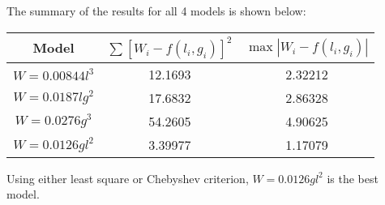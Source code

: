 \documentclass[10pt]{report}
\newcommand{\abs}[1] {\left| #1 \right|}
\begin{document}
\begin{enumerate}
	The summary of the results for all 4 models is shown below:
	\begin{table}[H]
		\centering
		\begin{tabular}{*{3}{c}} 
			\toprule
			Model & $\sum [W_i - f(l_i, g_i)]^2$ & $\max \abs{W_i - f(l_i, g_i)} $ \\ \midrule
			$W=0.00844l^3$ & 12.1693 & 2.32212  \\ \midrule
			$W=0.0187lg^2$ & 17.6832 & 2.86328  \\ \midrule
			$W=0.0276g^3$ & 54.2605 & 4.90625  \\ \midrule
			$W=0.0126gl^2$ & 3.39977 & 1.17079  \\ 
			\bottomrule
		\end{tabular}
	\end{table}
	Using either least square or Chebyshev criterion, $W=0.0126gl^2$ is the best model.
\end{enumerate}
\end{document}
